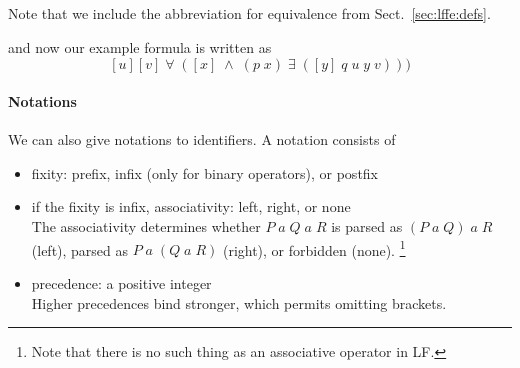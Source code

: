 \begin{twelfsig}
\decl{\FORM}{\type} \\
\decl{\TERM}{\type} \\
\decl{\true}{\FORM}\\
\decl{\false}{\FORM}\\
\decl{\wedge}{\FORM\arr\FORM\arr\FORM}\\
\decl{\vee}{\FORM\arr\FORM\arr\FORM}\\
\decl{\impl}{\FORM\arr\FORM\arr\FORM}\\
\decl{\neg}{\FORM\arr\FORM}\\
 \\
\decl{\doteq}{\TERM\arr\TERM\arr\FORM}\\
\\
\\
  \\
 \\
\end{twelfsig}
Note that we include the abbreviation for equivalence from Sect.~\ref{sec:lffe:defs}.

and now our example formula is written as
\[[u][v]\;\forall\;([x]\;\wedge\;(p\;x)\;\exists\;([y]\;q\;u\;y\;v)))\]

\paragraph{Notations}
We can also give notations to identifiers.
A notation consists of
\begin{itemize}
 \item fixity: prefix, infix (only for binary operators), or postfix
 \item if the fixity is infix, associativity: left, right, or none \\
   The associativity determines whether $P\;a\;Q\;a\;R$ is parsed as $(P\;a\;Q)\;a\;R$ (left), parsed as $P\;a\;(Q\;a\;R)$ (right), or forbidden (none).
   \footnote{Note that there is no such thing as an associative operator in LF.}
 \item precedence: a positive integer\\
  Higher precedences bind stronger, which permits omitting brackets.
\end{itemize}

